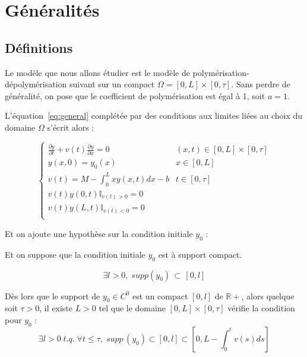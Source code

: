 \documentclass[a4paper]{article}
\newcommand{\pol}{a}
\newcommand{\dep}{b}
\begin{document}
\section{Généralités}

\subsection{Définitions}

Le modèle que nous allons étudier est le modèle de polymérisation-dépolymérisation suivant 
sur un compact $\Omega = [0,L] \times [0,\tau]$. 
Sans perdre de généralité, 
on pose que le coefficient de polymérisation est égal à 1, 
soit $\pol =1$.

L'équation~\eqref{eq:general} complétée par des conditions aux limites liées au choix du domaine $\Omega$ s'écrit alors :

\begin{equation}
		\label{eq:poldep}
		\begin{cases}
			\displaystyle \frac{\partial y}{\partial t}+ v(t) \frac{\partial y} {\partial x}  = 0 & (x,t) \in [0,L] \times [0, \tau] \\
             y(x,0) = y_{0} (x) & x\in[0,L]\\
			 v(t) = M - \int_0^L x y(x,t)dx - \dep & t \in [0,\tau]\\
			 v(t)y(0,t)\mathbb{I}_{v(t) > 0} = 0 \\
			 v(t)y(L,t)\mathbb{I}_{v(t) < 0} = 0 \\
		\end{cases}
\end{equation}

Et on ajoute une hypothèse sur la condition initiale $y_0$ :

Et on suppose que la condition initiale $y_0$ est à support compact.

\begin{equation}
	\label{hyp:compact}
	\exists l>0, \; supp(y_0) \, \subset \, [0,l]
\end{equation}


\begin{lemme}
	\label{lemme:compact}
	Dès lors que le support de $y_0 \in C^0$ est un compact $[0,l]$ de $\mathbb{R+}$,
	alors quelque soit $\tau >0$, il existe $L>0$ tel que le domaine $[0,L]\times [0,\tau]$
	vérifie la condition pour $y_0$ :
	\[\exists l>0 \; t.q. \; \forall t \leq \tau, \; supp \, (y_0) \subset [0,l]\subset [0,L-\int_{0}^t v(s)ds] \]
\end{lemme}
\end{document}
